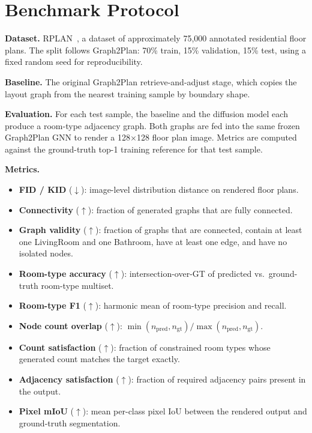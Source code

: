 \documentclass[11pt]{article}
\begin{document}
\section{Benchmark Protocol}

\textbf{Dataset.} RPLAN~\cite{wu2019data}, a dataset of approximately 75,000 annotated residential floor plans. The split follows Graph2Plan: 70\% train, 15\% validation, 15\% test, using a fixed random seed for reproducibility.

\textbf{Baseline.} The original Graph2Plan retrieve-and-adjust stage, which copies the layout graph from the nearest training sample by boundary shape.

\textbf{Evaluation.} For each test sample, the baseline and the diffusion model each produce a room-type adjacency graph. Both graphs are fed into the same frozen Graph2Plan GNN to render a 128$\times$128 floor plan image. Metrics are computed against the ground-truth top-1 training reference for that test sample.

\textbf{Metrics.}
\begin{itemize}
    \item \textbf{FID / KID} ($\downarrow$): image-level distribution distance on rendered floor plans.
    \item \textbf{Connectivity} ($\uparrow$): fraction of generated graphs that are fully connected.
    \item \textbf{Graph validity} ($\uparrow$): fraction of graphs that are connected, contain at least one LivingRoom and one Bathroom, have at least one edge, and have no isolated nodes.
    \item \textbf{Room-type accuracy} ($\uparrow$): intersection-over-GT of predicted vs.\ ground-truth room-type multiset.
    \item \textbf{Room-type F1} ($\uparrow$): harmonic mean of room-type precision and recall.
    \item \textbf{Node count overlap} ($\uparrow$): $\min(n_\text{pred}, n_\text{gt}) / \max(n_\text{pred}, n_\text{gt})$.
    \item \textbf{Count satisfaction} ($\uparrow$): fraction of constrained room types whose generated count matches the target exactly.
    \item \textbf{Adjacency satisfaction} ($\uparrow$): fraction of required adjacency pairs present in the output.
    \item \textbf{Pixel mIoU} ($\uparrow$): mean per-class pixel IoU between the rendered output and ground-truth segmentation.
\end{itemize}
\end{document}
